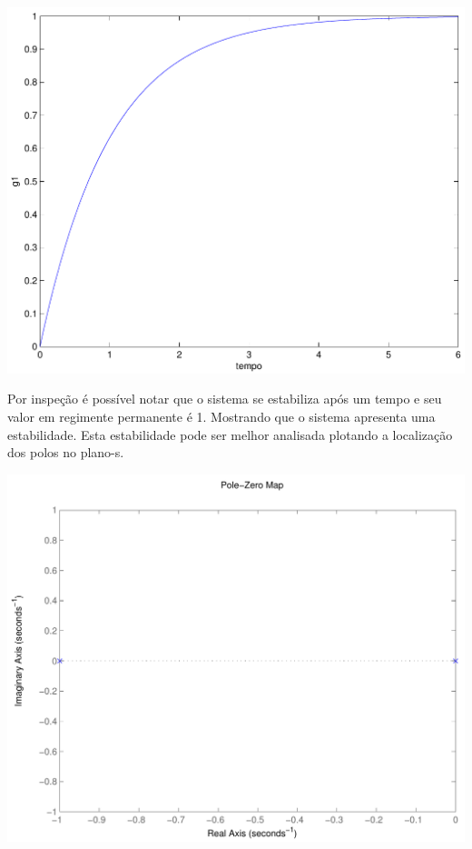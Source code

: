\documentclass[paper=a4, fontsize=11pt]{article}
\begin{document}
\begin{center}
    \includegraphics[scale=.5]{q1g1.pdf}
\end{center}

Por inspeção é possível notar que o sistema se estabiliza após um tempo
e seu valor em regimente permanente é 1. Mostrando que o sistema apresenta
uma estabilidade. Esta estabilidade pode ser melhor analisada plotando
a localização dos polos no plano-s.

\begin{center}
    \includegraphics[scale=.5]{pzq1g1.pdf}
\end{center}
\end{document}
